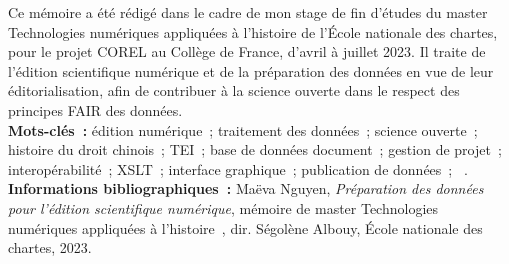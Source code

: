 \medskip	

Ce mémoire a été rédigé dans le cadre de mon stage de fin d'études du master \og Technologies numériques appliquées à l'histoire \fg de l'École nationale des chartes, pour le projet COREL au Collège de France, d'avril à juillet 2023. Il traite de l'édition scientifique numérique et de la préparation des données en vue de leur éditorialisation, afin de contribuer à la science ouverte dans le respect des principes FAIR des données.\\

\textbf{Mots-clés~:} édition numérique~; traitement des données~; science ouverte~; histoire du droit chinois~; TEI~; base de données document~; gestion de projet~; interopérabilité~; XSLT~; interface graphique~; publication de données~; \tp~.\\

\textbf{Informations bibliographiques~:} Maëva Nguyen, \textit{Préparation des données pour l'édition scientifique numérique}, mémoire de master \og Technologies numériques appliquées à l'histoire~\fg, dir. Ségolène Albouy, École nationale des chartes, 2023.
	
\clearemptydoublepage
